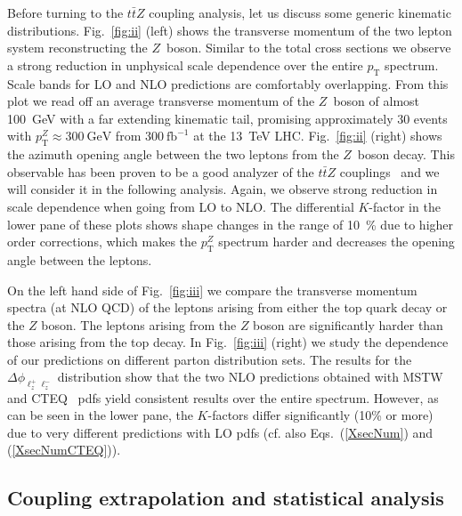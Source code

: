 \documentclass{JHEP3}
\newcommand{\GeV}{\mathrm{GeV}}
\newcommand{\pT}{p_{\mathrm{T}}}
\def\ttbZ{t\bar{t}Z}
\begin{document}
Before turning to the $\ttbZ$ coupling analysis, let us discuss some generic kinematic distributions.
Fig.~\ref{fig:ii} (left) shows the transverse momentum of the two lepton system reconstructing the $Z$~boson.
Similar to the total cross sections we observe a strong reduction in unphysical scale dependence over the entire $\pT$ spectrum.
Scale bands for LO and NLO predictions are comfortably overlapping. 
From this plot we read off an average transverse momentum of the $Z$~boson of almost 100~GeV with a far extending kinematic tail,
promising approximately 30 events with $\pT^Z \approx 300~\GeV$ from $300~\mathrm{fb}^{-1}$ at the 13~TeV LHC. 
Fig.~\ref{fig:ii} (right) shows the azimuth opening angle between the two leptons from the $Z$~boson decay.
This observable has been proven to be a good analyzer of the $\ttbZ$ couplings~\cite{Baur:2004uw} and we will consider it in the following analysis.
Again, we observe strong reduction in scale dependence when going from LO to NLO.
The differential $K$-factor in the lower pane of these plots shows shape changes in the range of 10~\% due to higher order corrections, which makes the $\pT^Z$ spectrum harder and decreases the opening angle between the leptons.



On the left hand side of Fig.~\ref{fig:iii} we compare the transverse momentum spectra (at NLO QCD) of the leptons arising from either 
the top quark decay or the $Z$ boson. The leptons arising from the $Z$ boson are significantly harder than those arising from the top decay.
In Fig.~\ref{fig:iii} (right) we study the dependence of our predictions on different parton distribution sets. 
The results for the $\Delta \phi_{\ell^+_z \ell^-_z}$ distribution show that the two NLO predictions 
obtained with MSTW~\cite{Martin:2009iq} and CTEQ~\cite{Pumplin:2002vw,Lai:2010vv} pdfs yield consistent results over the entire spectrum.
However, as can be seen in the lower pane, the $K$-factors differ significantly (10\% or more) 
due to very different predictions with LO pdfs (cf. also Eqs.~(\ref{XsecNum}) and (\ref{XsecNumCTEQ})). 


\subsection{Coupling extrapolation and statistical analysis}
\label{sect:analysis}
\end{document}
